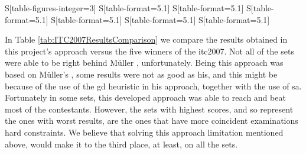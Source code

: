 \begin{table*}[!p]
\begin{tabular}{%
	S[table-figures-integer=3]%
	S[table-format=5.1]%
	S[table-format=5.1]%
	S[table-format=5.1]%
	S[table-format=5.1]%
	S[table-format=5.1]%
	S[table-format=5.1]%
    }
\bottomrule

\end{tabular}
\label{tab:20tests}
\end{table*}In Table \ref{tab:ITC2007ResultsComparison} we compare the results obtained in this project's approach versus the five winners of the \gls{itc2007}. Not all of the sets were able to be right behind M\"{u}ller \cite{Mueller2009}, unfortunately. Being this approach was based on M\"{u}ller's \cite{Mueller2009}, some results were not as good as his, and this might be because of the use of the \gls{gd} heuristic in his approach, together with the use of \gls{sa}. Fortunately in some sets, this developed approach was able to reach and beat most of the contestants. However, the sets with highest scores, and so represent the ones with worst results, are the ones that have more coincident examinations hard constraints. We believe that solving this approach limitation mentioned above, would make it to the third place, at least, on all the sets.\\
\\
